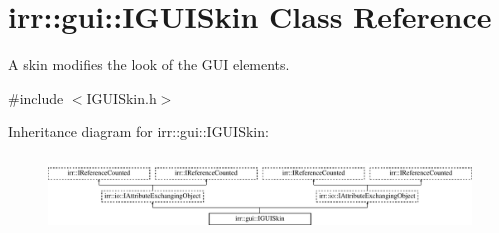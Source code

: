 \hypertarget{classirr_1_1gui_1_1IGUISkin}{}\section{irr\+:\+:gui\+:\+:I\+G\+U\+I\+Skin Class Reference}
\label{classirr_1_1gui_1_1IGUISkin}


A skin modifies the look of the G\+UI elements.  




{\ttfamily \#include $<$I\+G\+U\+I\+Skin.\+h$>$}

Inheritance diagram for irr\+:\+:gui\+:\+:I\+G\+U\+I\+Skin\+:\begin{figure}[H]
\begin{center}
\leavevmode
\includegraphics[height=2.019231cm]{classirr_1_1gui_1_1IGUISkin}
\end{center}
\end{figure}
